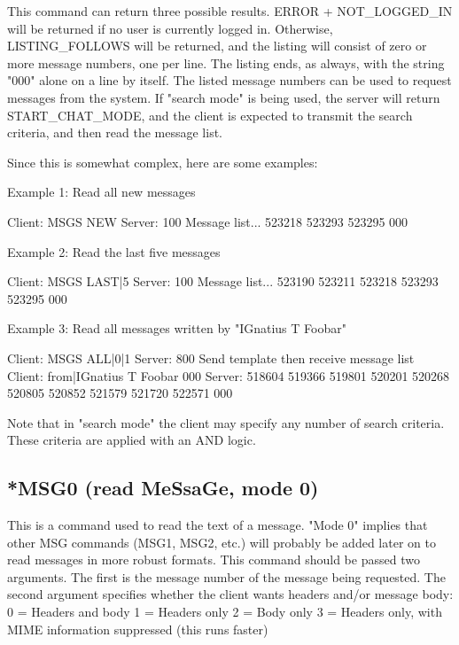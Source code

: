  This command can return three possible results.  ERROR + NOT_LOGGED_IN will
be returned if no user is currently logged in.  Otherwise, LISTING_FOLLOWS
will be returned, and the listing will consist of zero or more message
numbers, one per line.  The listing ends, as always, with the string "000"
alone on a line by itself.  The listed message numbers can be used to request
messages from the system.  If "search mode" is being used, the server will
return START_CHAT_MODE, and the client is expected to transmit the search
criteria, and then read the message list.

 Since this is somewhat complex, here are some examples:

 Example 1: Read all new messages

 Client:   MSGS NEW
 Server:   100 Message list...
           523218
           523293
           523295
           000

 Example 2: Read the last five messages

 Client:   MSGS LAST|5
 Server:   100 Message list...
           523190
           523211
           523218
           523293
           523295
           000

 Example 3: Read all messages written by "IGnatius T Foobar"

 Client:   MSGS ALL|0|1
 Server:   800 Send template then receive message list
 Client:   from|IGnatius T Foobar
           000
 Server:   518604
           519366
           519801
           520201
           520268
           520805
           520852
           521579
           521720
           522571
           000

 Note that in "search mode" the client may specify any number of search
criteria.  These criteria are applied with an AND logic.



\subsection{*MSG0 (read MeSsaGe, mode 0)}

 This is a command used to read the text of a message.  "Mode 0" implies that
other MSG commands (MSG1, MSG2, etc.) will probably be added later on to read
messages in more robust formats.  This command should be passed two arguments.
The first is the message number of the message being requested.  The second
argument specifies whether the client wants headers and/or message body:
 0 = Headers and body
 1 = Headers only
 2 = Body only
 3 = Headers only, with MIME information suppressed (this runs faster)

